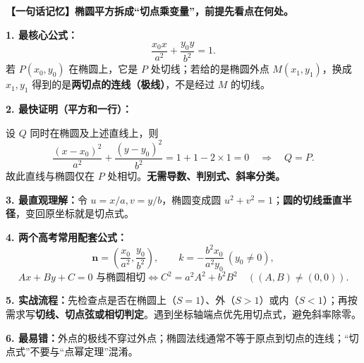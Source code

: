 \begin{summarybox}
\textbf{【一句话记忆】椭圆平方拆成“切点乘变量”，前提先看点在何处。}

\textbf{1. 最核心公式：}
\[
 \boxed{\frac{x_0x}{a^2}+\frac{y_0y}{b^2}=1.}
\]
若 $P(x_0,y_0)$ 在椭圆上，它是 $P$ 处切线；若给的是椭圆外点 $M(x_1,y_1)$，换成 $x_1,y_1$ 得到的是\textbf{两切点的连线（极线）}，不是经过 $M$ 的切线。

\textbf{2. 最快证明（平方和一行）：}

设 $Q$ 同时在椭圆及上述直线上，则
\[
 \frac{(x-x_0)^2}{a^2}+\frac{(y-y_0)^2}{b^2}
 =1+1-2\times1=0
 \quad\Longrightarrow\quad Q=P.
\]
故此直线与椭圆仅在 $P$ 处相切。\textbf{无需导数、判别式、斜率分类。}

\textbf{3. 最直观理解：}令 $u=x/a,v=y/b$，椭圆变成圆 $u^2+v^2=1$；\textbf{圆的切线垂直半径}，变回原坐标就是切点式。

\textbf{4. 两个高考常用配套公式：}
\[
 \boldsymbol n=\left(\frac{x_0}{a^2},\frac{y_0}{b^2}\right),
 \qquad k=-\frac{b^2x_0}{a^2y_0}\ (y_0\ne0),
\]
\[
 Ax+By+C=0\text{ 与椭圆相切}\iff
 \boxed{C^2=a^2A^2+b^2B^2}\quad((A,B)\ne(0,0)).
\]

\textbf{5. 实战流程：}先检查点是否在椭圆上（$S=1$）、外（$S>1$）或内（$S<1$）；再按需求写\textbf{切线、切点弦或相切判定}。遇到坐标轴端点优先用切点式，避免斜率除零。

\textbf{6. 最易错：}外点的极线不穿过外点；椭圆法线通常不等于原点到切点的连线；“切点式”不要与“点幂定理”混淆。
\end{summarybox}
